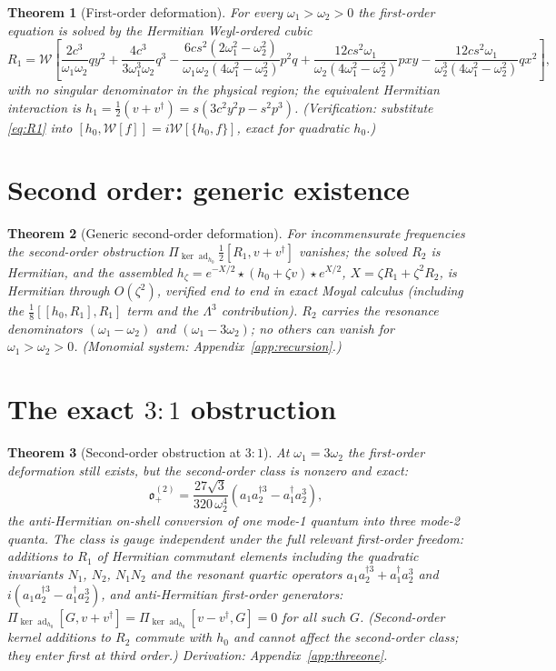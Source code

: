 \documentclass[11pt]{article}
\newtheorem{theorem}{Theorem}[section]
\theoremstyle{definition}
\theoremstyle{remark}
\newcommand{\w}{\omega}
\newcommand{\dg}{\dagger}
\newcommand{\ad}{\operatorname{ad}}
\newcommand{\ob}{\mathfrak o}
\newcommand{\kerad}{\Pi_{\ker\ad_{h_0}}}
\begin{document}
\begin{theorem}[First-order deformation]\label{thm:first}
For every $\w_1>\w_2>0$ the first-order equation is solved by the
Hermitian Weyl-ordered cubic
\begin{equation}\label{eq:R1}
R_1=\mathcal W\!\left[
\frac{2c^3}{\w_1\w_2}qy^2
+\frac{4c^3}{3\w_1^3\w_2}q^3
-\frac{6cs^2(2\w_1^2-\w_2^2)}{\w_1\w_2(4\w_1^2-\w_2^2)}p^2q
+\frac{12cs^2\w_1}{\w_2(4\w_1^2-\w_2^2)}pxy
-\frac{12cs^2\w_1}{\w_2^3(4\w_1^2-\w_2^2)}qx^2
\right],
\end{equation}
with no singular denominator in the physical region; the equivalent
Hermitian interaction is
$h_1=\tfrac12(v+v^{\dg})=s(3c^2y^2p-s^2p^3)$.  (Verification:
substitute \eqref{eq:R1} into $[h_0,\mathcal W[f]]=i\mathcal
W[\{h_0,f\}]$, exact for quadratic $h_0$.)
\end{theorem}

\section{Second order: generic existence}\label{sec:second}

\begin{theorem}[Generic second-order deformation]\label{thm:secondgen}
For incommensurate frequencies the second-order obstruction
$\kerad\tfrac12[R_1,v+v^{\dg}]$ vanishes; the solved $R_2$ is
Hermitian, and the assembled
$h_\zeta=e^{-X/2}\star(h_0+\zeta v)\star e^{X/2}$,
$X=\zeta R_1+\zeta^2R_2$, is Hermitian through $O(\zeta^2)$, verified
end to end in exact Moyal calculus (including the
$\tfrac18[[h_0,R_1],R_1]$ term and the $\Lambda^3$ contribution).
$R_2$ carries the resonance denominators $(\w_1-\w_2)$ and
$(\w_1-3\w_2)$; no others can vanish for $\w_1>\w_2>0$.  (Monomial
system: Appendix~\ref{app:recursion}.)
\end{theorem}

\section{The exact $3{:}1$ obstruction}\label{sec:threeone}

\begin{theorem}[Second-order obstruction at $3{:}1$]\label{thm:threeone}
At $\w_1=3\w_2$ the first-order deformation still exists, but the
second-order class is nonzero and exact:
\begin{equation}
\ob_+^{(2)}
=\frac{27\sqrt3}{320\,\w_2^4}
\left(a_1a_2^{\dg3}-a_1^{\dg}a_2^3\right),
\end{equation}
the anti-Hermitian on-shell conversion of one mode-1 quantum into three
mode-2 quanta.  The class is gauge independent under the full relevant
first-order freedom: additions to $R_1$ of Hermitian commutant elements
including the quadratic invariants $N_1$, $N_2$, $N_1N_2$ \emph{and the
resonant quartic operators} $a_1a_2^{\dg3}+a_1^{\dg}a_2^3$ and
$i(a_1a_2^{\dg3}-a_1^{\dg}a_2^3)$, and anti-Hermitian first-order
generators:
$\kerad[G,v+v^{\dg}]=\kerad[v-v^{\dg},G]=0$ for all such $G$.
(Second-order kernel additions to $R_2$ commute with $h_0$ and cannot
affect the second-order class; they enter first at third order.)
Derivation: Appendix~\ref{app:threeone}.
\end{theorem}
\end{document}
